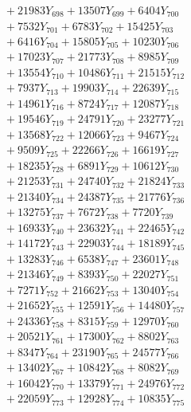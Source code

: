 \documentclass[a4paper,10pt]{article}
\begin{document}
{\begin{align}
&\;  + 21983 Y_{698} + 13507 Y_{699} + 6404 Y_{700} \\[0.3ex]
&\;  + 7532 Y_{701} + 6783 Y_{702} + 15425 Y_{703} \\[0.3ex]
&\;  + 6416 Y_{704} + 15805 Y_{705} + 10230 Y_{706} \\[0.3ex]
&\;  + 17023 Y_{707} + 21773 Y_{708} + 8985 Y_{709} \\[0.3ex]
&\;  + 13554 Y_{710} + 10486 Y_{711} + 21515 Y_{712} \\[0.3ex]
&\;  + 7937 Y_{713} + 19903 Y_{714} + 22639 Y_{715} \\[0.3ex]
&\;  + 14961 Y_{716} + 8724 Y_{717} + 12087 Y_{718} \\[0.5ex]\allowbreak
&\;  + 19546 Y_{719} + 24791 Y_{720} + 23277 Y_{721} \\[0.3ex]
&\;  + 13568 Y_{722} + 12066 Y_{723} + 9467 Y_{724} \\[0.3ex]
&\;  + 9509 Y_{725} + 22266 Y_{726} + 16619 Y_{727} \\[0.3ex]
&\;  + 18235 Y_{728} + 6891 Y_{729} + 10612 Y_{730} \\[0.3ex]
&\;  + 21253 Y_{731} + 24740 Y_{732} + 21824 Y_{733} \\[0.3ex]
&\;  + 21340 Y_{734} + 24387 Y_{735} + 21776 Y_{736} \\[0.3ex]
&\;  + 13275 Y_{737} + 7672 Y_{738} + 7720 Y_{739} \\[0.3ex]
&\;  + 16933 Y_{740} + 23632 Y_{741} + 22465 Y_{742} \\[0.3ex]
&\;  + 14172 Y_{743} + 22903 Y_{744} + 18189 Y_{745} \\[0.3ex]
&\;  + 13283 Y_{746} + 6538 Y_{747} + 23601 Y_{748} \\[0.5ex]\allowbreak
&\;  + 21346 Y_{749} + 8393 Y_{750} + 22027 Y_{751} \\[0.3ex]
&\;  + 7271 Y_{752} + 21662 Y_{753} + 13040 Y_{754} \\[0.3ex]
&\;  + 21652 Y_{755} + 12591 Y_{756} + 14480 Y_{757} \\[0.3ex]
&\;  + 24336 Y_{758} + 8315 Y_{759} + 12970 Y_{760} \\[0.3ex]
&\;  + 20521 Y_{761} + 17300 Y_{762} + 8802 Y_{763} \\[0.3ex]
&\;  + 8347 Y_{764} + 23190 Y_{765} + 24577 Y_{766} \\[0.3ex]
&\;  + 13402 Y_{767} + 10842 Y_{768} + 8082 Y_{769} \\[0.3ex]
&\;  + 16042 Y_{770} + 13379 Y_{771} + 24976 Y_{772} \\[0.3ex]
&\;  + 22059 Y_{773} + 12928 Y_{774} + 10835 Y_{775} \\[0.3ex]

\end{align}}
\end{document}
